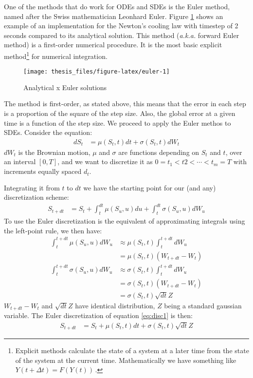 \documentclass[12pt,twoside]{reedthesis}
\theoremstyle{definition}
\theoremstyle{definition}
\theoremstyle{remark}
\begin{document}
  One of the methods that do work for ODEs and SDEs is the Euler method,
  named after the Swiss mathematician Leonhard Euler. Figure
  \ref{fig:euler} shows an example of an implementation for the Newton's
  cooling law with timestep of 2 seconds compared to its analytical
  solution. This method (\emph{a.k.a.} forward Euler method) is a
  first-order numerical procedure. It is the most basic explicit
  method\footnote{Explicit methods calculate the state of a system at a
    later time from the state of the system at the current time.
    Mathematically we have something like \(Y(t+\Delta t)=F(Y(t))\,\).}
  for numerical integration.
  \begin{figure}
  
  {\centering \texttt{[image: thesis\_files/figure-latex/euler-1]} 
  
  }
  
  \caption{Analytical x Euler solutions \label{euler}}\label{fig:euler}
  \end{figure}
  The method is first-order, as stated above, this means that the error in
  each step is a proportion of the square of the step size. Also, the
  global error at a given time is a function of the step size. We proceed
  to apply the Euler methos to SDEs. Consider the equation:
  \begin{align}
  dS_t &= \mu(S_t,t) dt + \sigma(S_t,t) dW_t
  \end{align}
  \(dW_t\) is the Brownian motion, \(\mu\) and \(\sigma\) are functions
  depending on \(S_t\) and \(t\), over an interval \([0,T]\), and we want
  to discretize it as \(0 = t_1 < t2 < \cdots < t_m = T\) with increments
  equally spaced \(d_t\).
  
  Integrating it from \(t\) to \(dt\) we have the starting point for our
  (and any) discretization scheme:
  \begin{align}
  \label{eq:disc1}
  S_{t+dt} &= S_t + \int_{t}^{dt}{\mu(S_u,u)}du + \int_{t}^{dt}{\sigma(S_u,u)} dW_u
  \end{align}
  To use the Euler discretization is the equivalent of approximating
  integrals using the left-point rule, we then have:
  \begin{align*}
   \int_{t}^{t+dt}{\mu(S_u,u)} dW_u &\approx \mu(S_t,t) \int_{t}^{t+dt}dW_u\\
  &= \mu(S_t,t) (W_{t+dt} - W_t)  \\
   \int_{t}^{t+dt}{\sigma(S_u,u)} dW_u &\approx \sigma(S_t,t) \int_{t}^{t+dt}dW_u\\
  &= \sigma(S_t,t) (W_{t+dt} - W_t)  \\
  &= \sigma(S_t,t) \sqrt{dt} Z
  \end{align*}
  \(W_{t+dt}-W_t\) and \(\sqrt{dt}Z\) have identical distribution, \(Z\)
  being a standard gaussian variable. The Euler discretization of equation
  \eqref{eq:disc1} is then:
  \begin{align}
  \label{eq:disc2}
  S_{t+dt} &= S_t + \mu(S_t,t)dt + \sigma(S_t,t)\sqrt{dt}Z
  \end{align}
\end{document}
